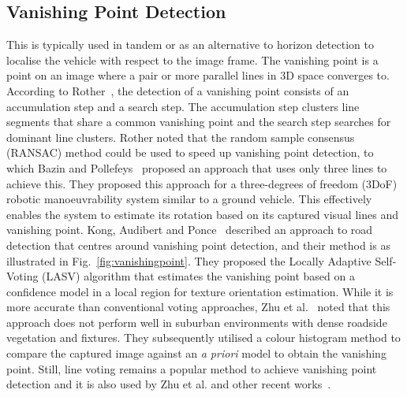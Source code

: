 \subsection{Vanishing Point Detection} \label{secvanishing}
This is typically used in tandem or as an alternative to horizon detection to localise the vehicle with respect to the image frame. The vanishing point is a point on an image where a pair or more parallel lines in 3D space converges to. According to Rother~\cite{rother_new_2002}, the detection of a vanishing point consists of an accumulation step and a search step. The accumulation step clusters line segments that share a common vanishing point and the search step searches for dominant line clusters. Rother noted that the random sample consensus (RANSAC) method could be used to speed up vanishing point detection, to which Bazin and Pollefeys~\cite{j._c._bazin_3-line_2012}  proposed an approach that uses only three lines to achieve this. They proposed this approach for a three-degrees of freedom (3DoF) robotic manoeuvrability system similar to a ground vehicle. This effectively enables the system to estimate its rotation based on its captured visual lines and vanishing point. Kong, Audibert and Ponce~\cite{h._kong_general_2010} described an approach to road detection that centres around vanishing point detection, and their method is as illustrated in Fig.~\ref{fig:vanishingpoint}. They proposed the Locally Adaptive Self-Voting (LASV) algorithm that estimates the vanishing point based on a confidence model in a local region for texture orientation estimation. While it is more accurate than conventional voting approaches, Zhu et al.~\cite{zhu_visual_2014} noted that this approach does not perform well in suburban environments with dense roadside vegetation and fixtures. They subsequently utilised a colour histogram method to compare the captured image against an \textit{a priori} model to obtain the vanishing point. Still, line voting remains a popular method to achieve vanishing point detection and it is also used by Zhu et al. and other recent works~\cite{wu_novel_2016, alvarez_combining_2014, ricaud_general_2014, t._h._bui_local_2012, p._moghadam_fast_2012}. 


